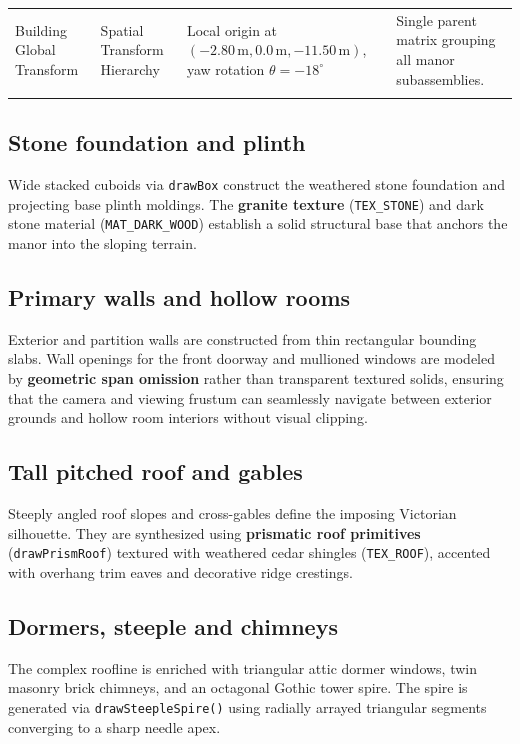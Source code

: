 \documentclass[10pt,a4paper,oneside]{article}
\begin{document}
\begin{longtable}{>{\raggedright\arraybackslash}p{}>{\raggedright\arraybackslash}p{}>{\raggedright\arraybackslash}p{}>{\raggedright\arraybackslash}p{}}
Building Global Transform & Spatial Transform Hierarchy & Local origin at $(-2.80\,\mathrm{m}, 0.0\,\mathrm{m}, -11.50\,\mathrm{m})$, yaw rotation $\theta = -18^\circ$ & Single parent matrix grouping all manor subassemblies.\\\addlinespace[3pt]

\bottomrule\end{longtable}

\subsection{Stone foundation and plinth}
Wide stacked cuboids via \texttt{drawBox} construct the weathered stone foundation and projecting base plinth moldings. The \textbf{granite texture} (\texttt{TEX\_STONE}) and dark stone material (\texttt{MAT\_DARK\_WOOD}) establish a solid structural base that anchors the manor into the sloping terrain.

\subsection{Primary walls and hollow rooms}
Exterior and partition walls are constructed from thin rectangular bounding slabs. Wall openings for the front doorway and mullioned windows are modeled by \textbf{geometric span omission} rather than transparent textured solids, ensuring that the camera and viewing frustum can seamlessly navigate between exterior grounds and hollow room interiors without visual clipping.

\subsection{Tall pitched roof and gables}
Steeply angled roof slopes and cross-gables define the imposing Victorian silhouette. They are synthesized using \textbf{prismatic roof primitives} (\texttt{drawPrismRoof}) textured with weathered cedar shingles (\texttt{TEX\_ROOF}), accented with overhang trim eaves and decorative ridge crestings.

\subsection{Dormers, steeple and chimneys}
The complex roofline is enriched with triangular attic dormer windows, twin masonry brick chimneys, and an octagonal Gothic tower spire. The spire is generated via \texttt{drawSteepleSpire()} using radially arrayed triangular segments converging to a sharp needle apex.
\end{document}
